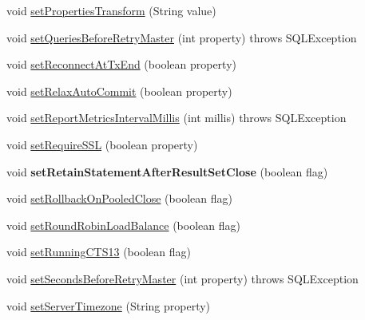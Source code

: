 \begin{DoxyCompactItemize}
\item 
void \mbox{\hyperlink{interfacecom_1_1mysql_1_1jdbc_1_1_connection_properties_a999fc9432437c9bf822f8e3ea6f03ce9}{set\+Properties\+Transform}} (String value)
\item 
void \mbox{\hyperlink{interfacecom_1_1mysql_1_1jdbc_1_1_connection_properties_a957986bd12af4715d9b9bb097109a61b}{set\+Queries\+Before\+Retry\+Master}} (int property)  throws S\+Q\+L\+Exception
\item 
void \mbox{\hyperlink{interfacecom_1_1mysql_1_1jdbc_1_1_connection_properties_a60491800609ee12f89f5545a9e26db4c}{set\+Reconnect\+At\+Tx\+End}} (boolean property)
\item 
void \mbox{\hyperlink{interfacecom_1_1mysql_1_1jdbc_1_1_connection_properties_a2b1a30e309c80866f41d0bc85d16e958}{set\+Relax\+Auto\+Commit}} (boolean property)
\item 
void \mbox{\hyperlink{interfacecom_1_1mysql_1_1jdbc_1_1_connection_properties_a98e28b386c63acdab88d1fdc0531d8ce}{set\+Report\+Metrics\+Interval\+Millis}} (int millis)  throws S\+Q\+L\+Exception
\item 
void \mbox{\hyperlink{interfacecom_1_1mysql_1_1jdbc_1_1_connection_properties_a8ed305ab3368867b5a6cc1cc0bf67ba2}{set\+Require\+S\+SL}} (boolean property)
\item 
\mbox{\label{interfacecom_1_1mysql_1_1jdbc_1_1_connection_properties_abd7d16cbf81dabc105d9d96f8866c162}} 
void {\bfseries set\+Retain\+Statement\+After\+Result\+Set\+Close} (boolean flag)
\item 
void \mbox{\hyperlink{interfacecom_1_1mysql_1_1jdbc_1_1_connection_properties_ac8700288ba51d4baf2062fa2a2856b88}{set\+Rollback\+On\+Pooled\+Close}} (boolean flag)
\item 
void \mbox{\hyperlink{interfacecom_1_1mysql_1_1jdbc_1_1_connection_properties_a13ef9e49985c436e69d1a8ed5eb095c6}{set\+Round\+Robin\+Load\+Balance}} (boolean flag)
\item 
void \mbox{\hyperlink{interfacecom_1_1mysql_1_1jdbc_1_1_connection_properties_abb37aa2ea5dd29021d40a76b33b82939}{set\+Running\+C\+T\+S13}} (boolean flag)
\item 
void \mbox{\hyperlink{interfacecom_1_1mysql_1_1jdbc_1_1_connection_properties_aebbbaaab658a9df1fd2af21e9c3ccbf5}{set\+Seconds\+Before\+Retry\+Master}} (int property)  throws S\+Q\+L\+Exception
\item 
void \mbox{\hyperlink{interfacecom_1_1mysql_1_1jdbc_1_1_connection_properties_a696230dd8e57568c8742fffecb1040aa}{set\+Server\+Timezone}} (String property)

\end{DoxyCompactItemize}
